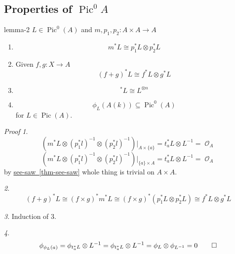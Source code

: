 \documentclass[10pt,]{book}
\makeatletter
\renewcommand*{\proofname}{Proof}
\renewenvironment{proof}[1][\proofname]{\par
  \pushQED{\qed}%
  \normalfont \topsep6\p@\@plus6\p@\relax
  \trivlist
  \item\relax
    {\itshape
    #1\@addpunct{.}}\hspace\labelsep\ignorespaces
}{%
  \popQED\endtrivlist\@endpefalse
}
\numberwithin{equation}{section}
\newcommand{\sheaf}[1]{\operatorname{\mathcal{#1}}}
\DeclareMathOperator{\Pic}{Pic}
\makeatother
\begin{document}
\subsection[{Properties of \(\Pic^0 A\)}]{Properties of \(\Pic^0 A\)}\label{subsection-21}
\begin{lemma}{}{}{lemma-2}%
\hypertarget{p-179}{}%
\(L\in \Pic^0(A)\) and \(m,p_1,p_2\colon A\times A \to A\)\leavevmode%
\begin{enumerate}
\item\hypertarget{li-29}{}%
\begin{equation*}
m^* L \cong p_1^* L\otimes p_2^* L
\end{equation*}
%
\item\hypertarget{li-30}{}Given \(f,g \colon X \to A\)%
\begin{equation*}
(f+g)^* L \cong f^* L \otimes g^* L
\end{equation*}
%
\item\hypertarget{li-31}{}%
\begin{equation*}
[n]^* L \cong L^{\otimes n}
\end{equation*}
%
\item\hypertarget{li-32}{}%
\begin{equation*}
\phi_L(A(k)) \subseteq \Pic^0(A)
\end{equation*}
for \(L \in \Pic (A)\).%
\end{enumerate}
%
\end{lemma}
\begin{proof}\hypertarget{proof-34}{}
\hypertarget{case-7}{}\textit{1}. \hypertarget{p-180}{}%
%
\begin{equation*}
(m^*L\otimes (p_1^*l)^{-1} \otimes (p_2^*l)^{-1})|_{A\times\{a\}} = t_a^*L \otimes L^{-1} = \sheaf O_A
\end{equation*}
%
\begin{equation*}
(m^*L\otimes (p_1^*l)^{-1} \otimes (p_2^*l)^{-1})|_{\{a\}\times A} = t_a^*L \otimes L^{-1} = \sheaf O_A
\end{equation*}
by \hyperref[thm-see-saw]{see-saw~\ref{thm-see-saw}} whole thing is trivial on \(A\times A\).%
\par\medskip\noindent
\hypertarget{case-8}{}\textit{2}. \hypertarget{p-181}{}%
%
\begin{equation*}
(f+g)^*L\cong (f\times g)^* m^*L \cong (f\times g)^*(p_1^*L \otimes p_2^*L) \cong f^*L \otimes g^*L
\end{equation*}
%
\par\medskip\noindent
\hypertarget{case-9}{}\textit{3}. \hypertarget{p-182}{}%
Induction of 3.%
\par\medskip\noindent
\hypertarget{case-10}{}\textit{4}. \hypertarget{p-183}{}%
%
\begin{equation*}
\phi_{\phi_L(a)} = \phi_{t^*_a L}\otimes L^{-1} = \phi _{t_a^*L}\otimes L^{-1} = \phi_L \otimes \phi_{L^{-1}} = 0\qedhere
\end{equation*}
%
\end{proof}
\end{document}
